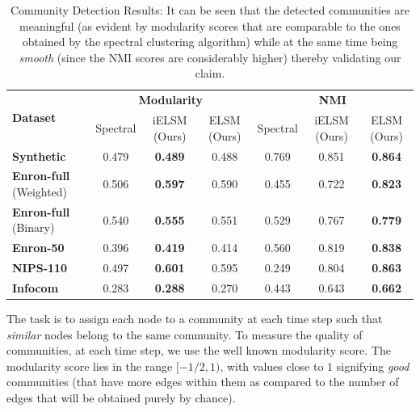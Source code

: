 \documentclass[letterpaper]{article} %
\begin{document}
\begin{table}[t]
\caption{Community Detection Results: It can be seen that the detected communities are meaningful (as evident by modularity scores that are comparable to the ones obtained by the spectral clustering algorithm) while at the same time being \textit{smooth} (since the NMI scores are considerably higher) thereby validating our claim.}
\label{table:clustering_results}
\begin{center}
\begin{small}
\begin{sc}
\begin{tabular}{p{1.9cm}|ccc|ccc}
\toprule
\multirow{2}{*}{\textbf{Dataset}} & \multicolumn{3}{c|}{\textbf{Modularity}} & \multicolumn{3}{c}{\textbf{NMI}} \\
& Spectral & \textup{i}ELSM (Ours) & ELSM (Ours) & Spectral & \textup{i}ELSM (Ours) & ELSM (Ours) \\
\midrule
\textbf{Synthetic} & 0.479 & \textbf{0.489} & 0.488 & 0.769 & 0.851 & \textbf{0.864} \\
\textbf{Enron-full} \newline(Weighted)& 0.506 & \textbf{0.597} & 0.590 & 0.455 & 0.722 & \textbf{0.823} \\
\textbf{Enron-full} \newline(Binary)& 0.540 & \textbf{0.555} & 0.551 & 0.529 & 0.767 & \textbf{0.779} \\
\textbf{Enron-50}  & 0.396 & \textbf{0.419} & 0.414 & 0.560 & 0.819 & \textbf{0.838} \\
\textbf{NIPS-110}  & 0.497 & \textbf{0.601} & 0.595 & 0.249 & 0.804 & \textbf{0.863} \\
\textbf{Infocom}   & 0.283 & \textbf{0.288} & 0.270 & 0.443 & 0.643 & \textbf{0.662} \\
\bottomrule
\end{tabular}
\end{sc}
\end{small}
\end{center}
\end{table}

The task is to assign each node to a community at each time step such that \textit{similar} nodes belong to the same community. To measure the quality of communities, at each time step, we use the well known modularity score. The modularity score lies in the range $[-1/2, 1)$, with values close to $1$ signifying \textit{good} communities (that have more edges within them as compared to the number of edges that will be obtained purely by chance).
\end{document}
